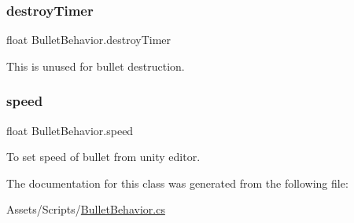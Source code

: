 \subsubsection{\texorpdfstring{destroyTimer}{destroyTimer}}
{\footnotesize\ttfamily float Bullet\+Behavior.\+destroy\+Timer}



This is unused for bullet destruction. 

\mbox{\label{class_bullet_behavior_a96bc765df5aeef30e70dc9f37f262085}} 
\subsubsection{\texorpdfstring{speed}{speed}}
{\footnotesize\ttfamily float Bullet\+Behavior.\+speed}



To set speed of bullet from unity editor. 



The documentation for this class was generated from the following file\+:\begin{DoxyCompactItemize}
\item 
Assets/\+Scripts/\mbox{\hyperlink{_bullet_behavior_8cs}{Bullet\+Behavior.\+cs}}\end{DoxyCompactItemize}
